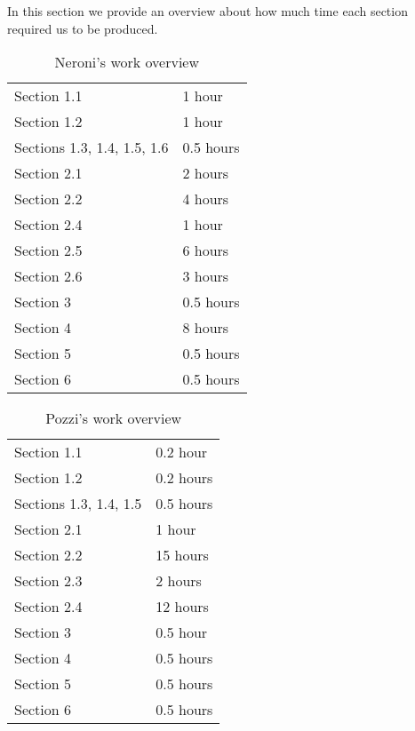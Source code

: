 In this section we provide an overview about how much time each section required us to be produced.


\begin{table} [H]
\centering
{}
{\centering
\begin{tabular}{m{2.5in}|m{.9in}}
Section 1.1 & 1 hour\\
Section 1.2 & 1 hour\\
Sections 1.3, 1.4, 1.5, 1.6 & 0.5 hours\\
Section 2.1 & 2 hours\\
Section 2.2 & 4 hours\\
Section 2.4 & 1 hour\\
Section 2.5 & 6 hours\\
Section 2.6 & 3 hours\\
Section 3 & 0.5 hours\\
Section 4 & 8 hours\\
Section 5 & 0.5 hours\\
Section 6 & 0.5 hours\\
\end{tabular}
}
\caption{Neroni's work overview}
\end{table}


\begin{table} [H]
\centering
{}
{\centering
\begin{tabular}{m{2.5in}|m{.9in}}
Section 1.1 & 0.2 hour\\
Section 1.2 & 0.2 hours\\
Sections 1.3, 1.4, 1.5 & 0.5 hours\\
Section 2.1 & 1 hour\\
Section 2.2 & 15 hours\\
Section 2.3 & 2 hours\\
Section 2.4 & 12 hours\\
Section 3 & 0.5 hour\\
Section 4 & 0.5 hours\\
Section 5 & 0.5 hours\\
Section 6 & 0.5 hours\\
\end{tabular}
}
\caption{Pozzi's work overview}
\end{table}



